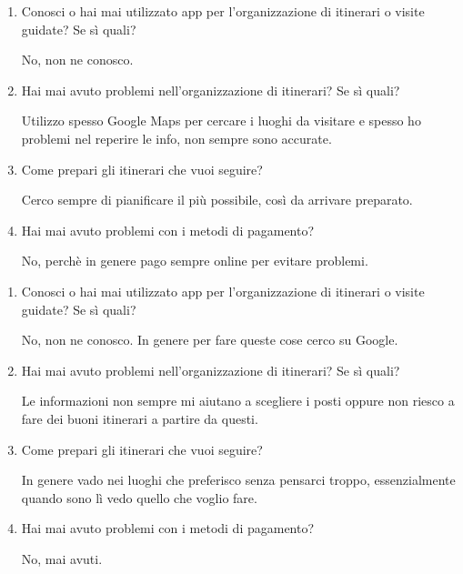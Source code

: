 
\begin{enumerate}

\item Conosci o hai mai utilizzato app per l'organizzazione di itinerari o visite guidate? Se sì quali?

No, non ne conosco.

\item Hai mai avuto problemi nell'organizzazione di itinerari? Se sì quali?

Utilizzo spesso Google Maps per cercare i luoghi da visitare e spesso ho problemi nel reperire le info, non sempre sono accurate.

\item Come prepari gli itinerari che vuoi seguire?

Cerco sempre di pianificare il più possibile, così da arrivare preparato.

\item Hai mai avuto problemi con i metodi di pagamento?

No, perchè in genere pago sempre online per evitare problemi.

\end{enumerate}


\begin{enumerate}

\item Conosci o hai mai utilizzato app per l'organizzazione di itinerari o visite guidate? Se sì quali?

No, non ne conosco. In genere per fare queste cose cerco su Google.

\item Hai mai avuto problemi nell'organizzazione di itinerari? Se sì quali?

Le informazioni non sempre mi aiutano a scegliere i posti oppure non riesco a fare dei buoni itinerari a partire da questi.

\item Come prepari gli itinerari che vuoi seguire?

In genere vado nei luoghi che preferisco senza pensarci troppo, essenzialmente quando sono lì vedo quello che voglio fare.

\item Hai mai avuto problemi con i metodi di pagamento?

No, mai avuti.

\end{enumerate}

